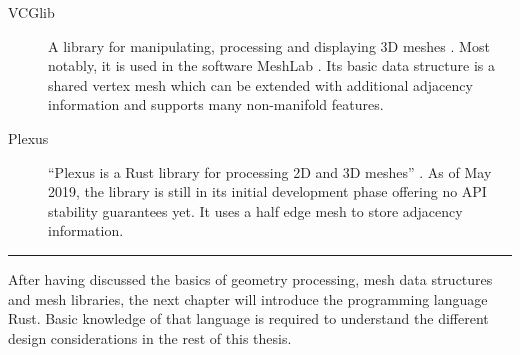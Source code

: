 \begin{description}
  \item [VCGlib] A \cpp library for manipulating, processing and displaying 3D meshes \cite{vcglibhomepage}.
  Most notably, it is used in the software MeshLab \cite{meshlabhomepage}.
  Its basic data structure is a shared vertex mesh which can be extended with additional adjacency information and supports many non-manifold features.

  \item [Plexus] \enquote{Plexus is a Rust library for processing 2D and 3D meshes} \cite{plexus}.
  As of May 2019, the library is still in its initial development phase offering no API stability guarantees yet.
  It uses a half edge mesh to store adjacency information.
\end{description}


\setlength{\tabcolsep}{\origtabcolsep}

\vfill

\begin{center}
\rule{.8\textwidth}{.15mm}
\end{center}

After having discussed the basics of geometry processing, mesh data structures and mesh libraries, the next chapter will introduce the programming language Rust.
Basic knowledge of that language is required to understand the different design considerations in the rest of this thesis.
